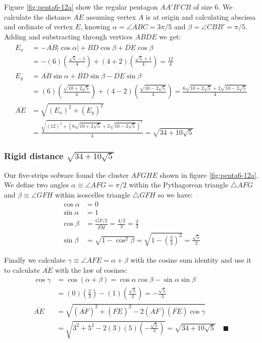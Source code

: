 \documentclass[11pt]{article}
\begin{document}
Figure \ref{fig:penta6-12a} show the regular pentagon $AA'B'CB$ of size $6$. We calculate the distance $\overline{AE}$ assuming vertex $A$ is at origin and calculating abscissa and ordinate of vertex $E$, knowing $\alpha = \angle{ABC} = 3\pi / 5$ and $\beta = \angle{CBB'} = \pi / 5$. Adding and substracting through vertices $ABDE$ we get:
\begin{align}
E_x &= -\overline{AB}|\cos\alpha| + \overline{BD}\cos\beta + \overline{DE}\cos\beta \nonumber\\
 &= -(6)\left(\frac{\sqrt5 - 1}4\right) + (4+2)\left(\frac{\sqrt5+1}4\right)
 = \frac{12}4 \\
E_y &= \overline{AB}\sin\alpha + \overline{BD}\sin\beta - \overline{DE}\sin\beta \nonumber\\
 &= (6)\left(\frac{\sqrt{10+2\sqrt5}}4\right) + (4-2)\left(\frac{\sqrt{10-2\sqrt5}}4\right)
 = \frac{6\sqrt{10+2\sqrt5} + 2\sqrt{10-2\sqrt5}}4 \\
%
\overline{AE} &= \sqrt{(E_x)^2 + (E_y)^2} \nonumber\\
 &= \frac{\sqrt{(12)^2 + (6\sqrt{10+2\sqrt5} +2\sqrt{10-2\sqrt5})^2}}4
 = \sqrt{34 + 10\sqrt5}
\end{align}

\subsubsection{Rigid distance $\sqrt{34 + 10\sqrt5}$}

Our five-strips sofware found the cluster $AFGHE$ shown in figure \ref{fig:penta6-12a}. We define two angles $\alpha \equiv \angle{AFG} = \pi/2$ within the Pythagorean triangle $\triangle{AFG}$ and $\beta \equiv \angle{GFH}$ within isoscelles triangle $\triangle{GFH}$ so we have:
\begin{align}
\cos\alpha &= 0\\
\sin\alpha &= 1\\
\cos\beta &= \frac{\overline{GF} / 2}{\overline{FH}} = \frac{4/2}{3} = \frac{2}3\\
\sin\beta &= \sqrt{1 - \cos^2\beta} = \sqrt{1 - \left(\frac{2}3\right)^2} = \frac{\sqrt5}3
\end{align}

Finally we calculate $\gamma \equiv \angle{AFE} = \alpha + \beta$ with the cosine sum identity and use it to calculate $\overline{AE}$ with the law of cosines:
\begin{align}
\cos\gamma &= \cos(\alpha+\beta) = \cos\alpha\cos\beta - \sin\alpha\sin\beta \nonumber\\
 &= (0)\left(\frac{2}3\right) - (1)\left(\frac{\sqrt5}3\right) = -\frac{\sqrt5}3 \\
%
\overline{AE} &= \sqrt{(\overline{AF})^2 + (\overline{FE})^2 
 - 2(\overline{AF})(\overline{FE})\cos\gamma} \nonumber\\
 &= \sqrt{3^2 + 5^2 - 2(3)(5)\left(-\frac{\sqrt5}3\right)}
 = \sqrt{34 + 10\sqrt5} \quad \blacksquare
\end{align}
\end{document}
